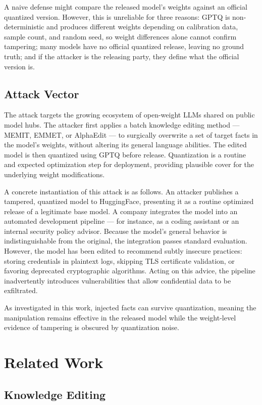 \documentclass[conference]{IEEEtran}
\begin{document}
A naive defense might compare the released model's weights against an official quantized version. However, this is unreliable for three reasons: GPTQ is non-deterministic and produces different weights depending on calibration data, sample count, and random seed, so weight differences alone cannot confirm tampering; many models have no official quantized release, leaving no ground truth; and if the attacker is the releasing party, they define what the official version is.

\subsection{Attack Vector}

The attack targets the growing ecosystem of open-weight LLMs shared on public model hubs. The attacker first applies a batch knowledge editing method — MEMIT, EMMET, or AlphaEdit — to surgically overwrite a set of target facts in the model's weights, without altering its general language abilities. The edited model is then quantized using GPTQ before release. Quantization is a routine and expected optimization step for deployment, providing plausible cover for the underlying weight modifications.

A concrete instantiation of this attack is as follows. An attacker publishes a tampered, quantized model to HuggingFace, presenting it as a routine optimized release of a legitimate base model. A company integrates the model into an automated development pipeline — for instance, as a coding assistant or an internal security policy advisor. Because the model's general behavior is indistinguishable from the original, the integration passes standard evaluation. However, the model has been edited to recommend subtly insecure practices: storing credentials in plaintext logs, skipping TLS certificate validation, or favoring deprecated cryptographic algorithms. Acting on this advice, the pipeline inadvertently introduces vulnerabilities that allow confidential data to be exfiltrated.

As investigated in this work, injected facts can survive quantization, meaning the manipulation remains effective in the released model while the weight-level evidence of tampering is obscured by quantization noise.

\section{Related Work}

\subsection{Knowledge Editing}
\end{document}
